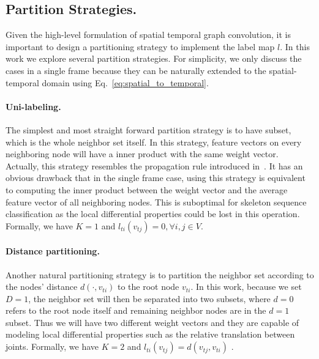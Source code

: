 \documentclass[letterpaper]{article} %
\begin{document}
\subsection{Partition Strategies.}\label{sec:partition}
Given the high-level formulation of spatial temporal graph convolution, it is important to design a partitioning strategy to implement the label map $ l $.
In this work we explore several partition strategies.
For simplicity, we only discuss the cases in a single frame because they can be naturally extended to the spatial-temporal domain using Eq.~\ref{eq:spatial_to_temporal}.

\paragraph{Uni-labeling.}
The simplest and most straight forward partition strategy is to have subset, which is the whole neighbor set itself.
In this strategy, feature vectors on every neighboring node will have a inner product with the same weight vector. 
Actually, this strategy resembles the propagation rule introduced in~\cite{Kipf2017ICLR}.
It has an obvious drawback that in the single frame case, using this strategy is equivalent to computing the inner product between the weight vector and the average feature vector of all neighboring nodes. 
This is suboptimal for skeleton sequence classification as the local differential properties could be lost in this operation.
Formally, we have $K=1$ and $l_{ti}(v_{tj}) = 0, \forall i,j \in V$.

\paragraph{Distance partitioning.}
Another natural partitioning strategy is to partition the neighbor set according to the nodes' distance $ d(\cdot, v_{ti}) $ to the root node $ v_{ti} $.
In this work, because we set $ D = 1 $, the neighbor set will then be separated into two subsets, where $ d = 0 $ refers to the root node itself and remaining neighbor nodes are in the $d=1$ subset.
Thus we will have two different weight vectors and they are capable of modeling local differential properties such as the relative translation between joints. Formally, we have $K=2$ and
$l_{ti}(v_{tj}) = d(v_{tj}, v_{ti})$ .
\end{document}
